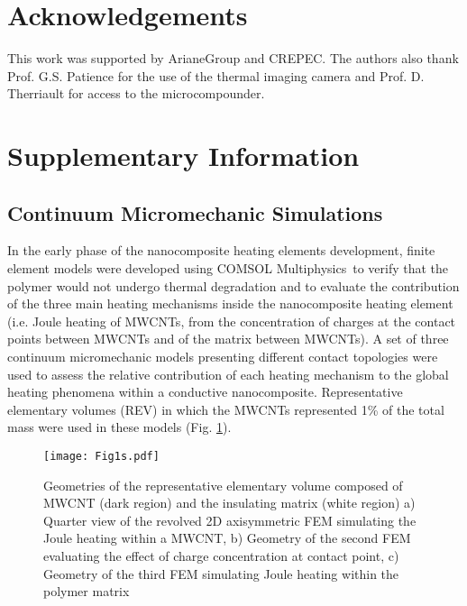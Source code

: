 \section{Acknowledgements}

This work was supported by ArianeGroup and CREPEC. 
The authors also thank Prof. G.S. Patience for the use of the thermal imaging camera and Prof. D. Therriault for access to the microcompounder. 

\section{Supplementary Information}

\subsection{Continuum Micromechanic Simulations}

In the early phase of the nanocomposite heating elements development, finite element models were developed using COMSOL Mul\-ti\-phy\-sics\-\textregistered \ to verify that the polymer would not undergo thermal degradation and to evaluate the contribution of the three main heating mechanisms inside the nanocomposite heating element (i.e. Joule heating of MWCNTs, from the concentration of charges at the contact points between MWCNTs and of the matrix between MWCNTs).  
A set of three continuum micromechanic models presenting different contact topologies were used to assess the relative contribution of each heating mechanism to the global heating phenomena within a conductive nanocomposite. 
Representative elementary volumes (REV) in which the MWCNTs represented 1\% of the total mass were used in these models (Fig. \ref{fig:geometry}). 

\begin{figure}[htb]
	\centering
	\texttt{[image: Fig1s.pdf]}
	\caption{Geometries of the representative elementary volume composed of MWCNT (dark region) and the insulating matrix (white region) a) Quarter view of the revolved 2D axisymmetric FEM simulating the Joule heating within a MWCNT, b) Geometry of the second FEM evaluating the effect of charge concentration at contact point, c) Geometry of the third FEM simulating Joule heating within the polymer matrix \cite{Brassard2018_figshare_article1}}
	\label{fig:geometry}
\end{figure}

